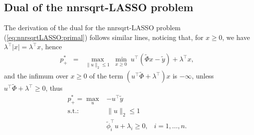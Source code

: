 \documentclass[11pt]{article}
\newcommand{\tran}{^{\top}}
\newcommand{\lam}{\lambda}
\newcommand{\bea}{\begin{eqnarray}}
\newcommand{\eea}{\end{eqnarray}}
\newcommand{\beas}{\begin{eqnarray*}}
\newcommand{\eeas}{\end{eqnarray*}}
\begin{document}
\subsection{Dual of the nnrsqrt-LASSO problem}
The derivation of the dual for the nnrsqrt-LASSO    problem (\ref{eq:nnrsqrtLASSO:primal})
follows  similar lines, noticing that,
for $x\geq 0$, we have $\lam\tran |x| = \lam\tran x$, hence 
\beas
p^*_+  & = & \displaystyle{\max_{\|u\|_2\leq 1}} \;  \displaystyle{\min_{x\geq 0}} \;
u\tran (\tilde \Phi x - \tilde y) +  \lam\tran x,
\eeas
and the infimum over $x\geq 0$ of the term $(u\tran \tilde \Phi +  \lam\tran)x $ is $-\infty$, unless 
$u\tran \tilde \Phi  +  \lam\tran\geq 0$, thus
\bea
p^*_+  = \displaystyle{\max_{u}} & 
-u\tran  \tilde y  \label{eq:rsqrtLASSO:dual+} \\
\mbox{s.t.:} & \|u\|_2\leq 1 \nonumber \\
& \tilde \phi_i\tran u   +  \lam_i \geq  0, & i=1,\ldots,n. 
 \label{eq:rsqrtLASSO:dual_cinf+} 
\eea
\end{document}
